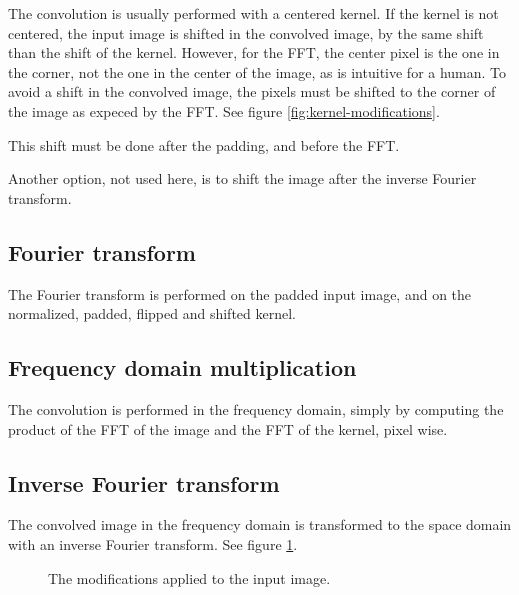 \documentclass{InsightArticle}
\begin{document}
The convolution is usually performed with a centered kernel. If the kernel is not centered, the input image
is shifted in the convolved image, by the same shift than the shift of the kernel. However, for the
FFT, the center pixel is the one in the corner, not the one in the center of the image, as is intuitive
for a human. To avoid a shift in the convolved image, the pixels must be shifted to the corner
of the image as expeced by the FFT. See figure \ref{fig:kernel-modifications}.

This shift must be done after the padding, and before the FFT.

Another option, not used here, is to shift the image after the inverse Fourier transform.

\subsection{Fourier transform}

The Fourier transform is performed on the padded input image, and on the normalized, padded, flipped
and shifted kernel.

\subsection{Frequency domain multiplication}

The convolution is performed in the frequency domain, simply by computing the product of the FFT of
the image and the FFT of the kernel, pixel wise.

\subsection{Inverse Fourier transform}

The convolved image in the frequency domain is transformed to the space domain with an inverse Fourier
transform. See figure \ref{fig:image-modifications}.

\begin{figure}[htbp]
\begin{center}
\caption{The modifications applied to the input image.\label{fig:image-modifications}}
\end{center}
\end{figure}
\end{document}
